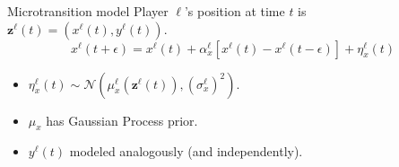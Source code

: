 \documentclass[10pt]{beamer}
\newcommand{\norm}{\mathcal{N}}
\begin{document}
\begin{frame}{Microtransition model}
Player $\ell$'s position at time $t$ is $\mathbf{z}^{\ell}(t) = (x^{\ell}(t), y^{\ell}(t))$.
$$x^{\ell}(t + \epsilon) =  x^{\ell}(t) + \alpha^{\ell}_x[x^{\ell}(t) - x^{\ell}(t - \epsilon)] + \eta^{\ell}_x(t)$$
\begin{itemize}
\item $\eta^{\ell}_x(t) \sim \norm (\mu^{\ell}_x(\mathbf{z}^{\ell}(t)), (\sigma^{\ell}_x)^2)$.
\item $\mu_x$ has Gaussian Process prior.
\item $y^{\ell}(t)$ modeled analogously (and independently). 
\end{itemize}

\pause
{}
\end{frame}
\end{document}
